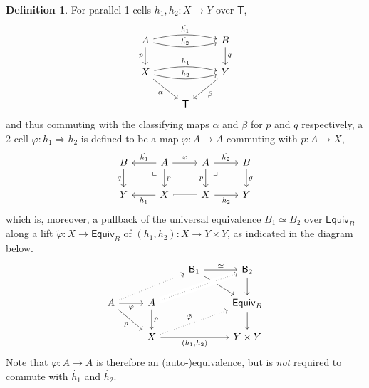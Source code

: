 \documentclass[12pt,reqno]{amsart}
\renewcommand{\to}{\ensuremath{\rightarrow}}
\newcommand{\T}{\ensuremath{\mathsf{T}}}
\newcommand{\pbcorner}{\arrow[dr,phantom,"\lrcorner" very near start, shift right=.5ex]} %
\newcommand{\pbcornerright}{\arrow[dl,phantom,"\llcorner" very near start, shift left=.5ex]} %
\theoremstyle{remark}
\theoremstyle{definition}
\newtheorem{definition}[theorem]{Definition}
\begin{document}
%
\begin{definition}\label{def:2cells}%
For parallel 1-cells $h_1, h_2 : X \to Y$ over $\T$,
\begin{equation}\label{eq:parallelclassifiedfamilies}
\begin{tikzcd}
	 A \ar[d,swap, "p"] \ar[rr,bend right = 3ex, "{\dot{h_2}}"]  \ar[rr,bend left  = 3ex, "{\dot{h_1}}"]  && B \ar[d, "q"] \\  
	 X \ar[rr,swap,bend right = 3ex,swap, "{h_2}"] \ar[rr,bend left  = 3ex, "{h_1}"]  \ar[rd,swap, "\alpha"] &&  \ar[ld, "\beta"]  Y\\
	&\T&
 \end{tikzcd}
 \end{equation}
and thus commuting with the classifying maps $\alpha$ and $\beta$ for $p$ and $q$ respectively, a 2-cell $\varphi : h_1 \Rightarrow h_2$ is defined to be a map $\varphi : A\to A$ commuting with $p : A \to X$,
\begin{equation}\label{eq:parallelclassifiedfamilies2}
\begin{tikzcd}
 B  \ar[d,swap, "q"] &  \ar[l,swap, "{\dot{h_1}}"] A \ar[r, "{\varphi}"] \ar[d, "p"] \pbcornerright & A \ar[d, swap, "p"]  \ar[r, "{\dot{h_2}}"]   \pbcorner & B \ar[d, "g"] \\  
 Y &  \ar[l, "{h_1}"]  X \ar[r, equals] & X \ar[r,swap, "{h_2}"] &  Y
 \end{tikzcd}
 \end{equation}
which is, moreover, a pullback of the universal equivalence $B_1\simeq B_2$ over $\mathsf{Equiv}_B$ along a lift $\tilde{\varphi} : X \to \mathsf{Equiv}_B$ of  $(h_1, h_2) : X \to Y \times Y$, as indicated in the diagram below.
\begin{equation}\label{diag:2celldef3}
\begin{tikzcd} 
	&& \mathsf{B}_1 \ar[rd]  \ar[r,"{\simeq}"]  & \mathsf{B}_2 \ar[d] \\  
A \ar[rd,swap, "p"] \ar[r,swap, "{\varphi}"]  \ar[rru, dotted] & A \ar[d, "p"] \ar[rru, crossing over, dotted] && \mathsf{Equiv}_B \ar[d] \\  
& X \ar[rru, dotted, "{\tilde{\varphi}}"] \ar[rr, swap, "{(h_1, h_2)}"] && Y \times Y
	 \end{tikzcd}
 \end{equation}
 Note that $\varphi : A \to A$ is therefore an (auto-)equivalence, but is \emph{not} required to commute with $\dot{h_1}$ and $\dot{h_2}$.  
\end{definition}
\end{document}

